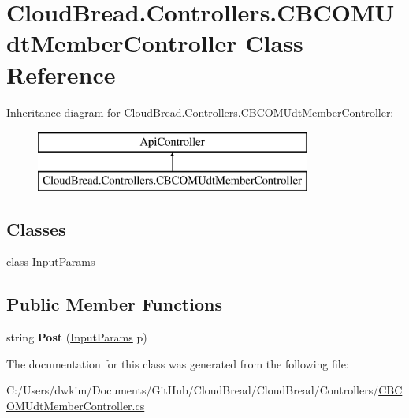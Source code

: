 \hypertarget{class_cloud_bread_1_1_controllers_1_1_c_b_c_o_m_udt_member_controller}{}\section{Cloud\+Bread.\+Controllers.\+C\+B\+C\+O\+M\+Udt\+Member\+Controller Class Reference}
\label{class_cloud_bread_1_1_controllers_1_1_c_b_c_o_m_udt_member_controller}
Inheritance diagram for Cloud\+Bread.\+Controllers.\+C\+B\+C\+O\+M\+Udt\+Member\+Controller\+:\begin{figure}[H]
\begin{center}
\leavevmode
\includegraphics[height=2.000000cm]{class_cloud_bread_1_1_controllers_1_1_c_b_c_o_m_udt_member_controller}
\end{center}
\end{figure}
\subsection*{Classes}
\begin{DoxyCompactItemize}
\item 
class \hyperlink{class_cloud_bread_1_1_controllers_1_1_c_b_c_o_m_udt_member_controller_1_1_input_params}{Input\+Params}
\end{DoxyCompactItemize}
\subsection*{Public Member Functions}
\begin{DoxyCompactItemize}
\item 
string {\bfseries Post} (\hyperlink{class_cloud_bread_1_1_controllers_1_1_c_b_c_o_m_udt_member_controller_1_1_input_params}{Input\+Params} p)\hypertarget{class_cloud_bread_1_1_controllers_1_1_c_b_c_o_m_udt_member_controller_a08ce03c3afd271a0554068400718fe1f}{}\label{class_cloud_bread_1_1_controllers_1_1_c_b_c_o_m_udt_member_controller_a08ce03c3afd271a0554068400718fe1f}

\end{DoxyCompactItemize}


The documentation for this class was generated from the following file\+:\begin{DoxyCompactItemize}
\item 
C\+:/\+Users/dwkim/\+Documents/\+Git\+Hub/\+Cloud\+Bread/\+Cloud\+Bread/\+Controllers/\hyperlink{_c_b_c_o_m_udt_member_controller_8cs}{C\+B\+C\+O\+M\+Udt\+Member\+Controller.\+cs}\end{DoxyCompactItemize}
